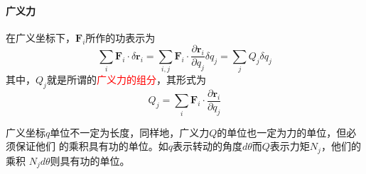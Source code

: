 \paragraph*{广义力}
在广义坐标下，$\bm{F}_i$所作的功表示为
\begin{equation}
	\sum_i \bm{F}_i \cdot \delta \bm{r}_i = \sum_{i, j}\bm{F}_i \cdot \frac{\partial \bm{r}_i}{\partial q_j} \delta q_j = \sum_{j} Q_j \delta q_j
\end{equation} 
其中，$Q_j$就是所谓的\textcolor{red}{广义力的组分}，其形式为
\begin{equation}
	Q_j = \sum_{i} \bm{F}_i \cdot \frac{\partial \bm{r}_i}{\partial q_j}	\label{eq_generalized_force}
\end{equation} 
\begin{note}
	广义坐标$q$单位不一定为长度，同样地，广义力$Q$的单位也一定为力的单位，但必须保证他们
    的乘积具有功的单位。如$q$表示转动的角度$d\theta$而$Q$表示力矩$N_j$，他们的乘积
    $N_j d\theta$则具有功的单位。
\end{note}

